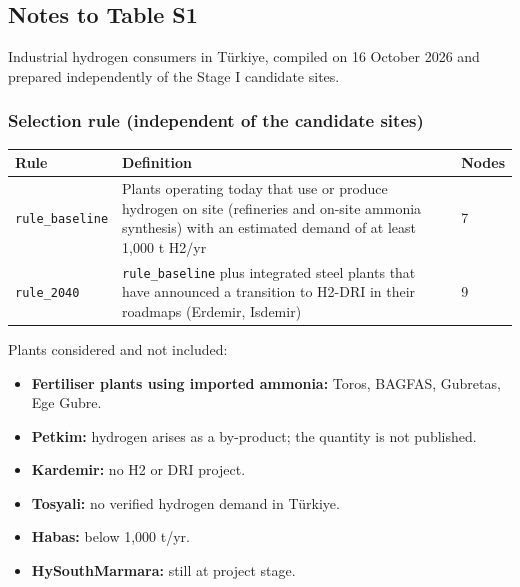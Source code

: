 \documentclass[11pt,a4paper]{article}
\begin{document}
\subsection{Notes to Table S1}

Industrial hydrogen consumers in Türkiye, compiled on 16 October 2026 and prepared independently of the Stage I candidate sites.

\subsubsection{Selection rule (independent of the candidate sites)}

\begin{center}\footnotesize
\begin{tabularx}{\textwidth}{>{\hsize=0.450\hsize\raggedright\arraybackslash}X>{\hsize=1.550\hsize\raggedright\arraybackslash}Xl}
\toprule
\textbf{Rule} & \textbf{Definition} & \textbf{Nodes} \\
\midrule
\texttt{rule\_\allowbreak{}baseline} & Plants operating today that use or produce hydrogen on site (refineries and on-site ammonia synthesis) with an estimated demand of at least 1,000 t H2/\allowbreak{}yr & 7 \\
\texttt{rule\_\allowbreak{}2040} & \texttt{rule\_\allowbreak{}baseline} plus integrated steel plants that have announced a transition to H2-DRI in their roadmaps (Erdemir, Isdemir) & 9 \\
\bottomrule
\end{tabularx}
\end{center}

Plants considered and not included:

\begin{itemize}\setlength\itemsep{1pt}

  \item \textbf{Fertiliser plants using imported ammonia:} Toros, BAGFAS, Gubretas, Ege Gubre.

  \item \textbf{Petkim:} hydrogen arises as a by-product; the quantity is not published.

  \item \textbf{Kardemir:} no H2 or DRI project.

  \item \textbf{Tosyali:} no verified hydrogen demand in Türkiye.

  \item \textbf{Habas:} below 1,000 t/yr.

  \item \textbf{HySouthMarmara:} still at project stage.

\end{itemize}
\end{document}
